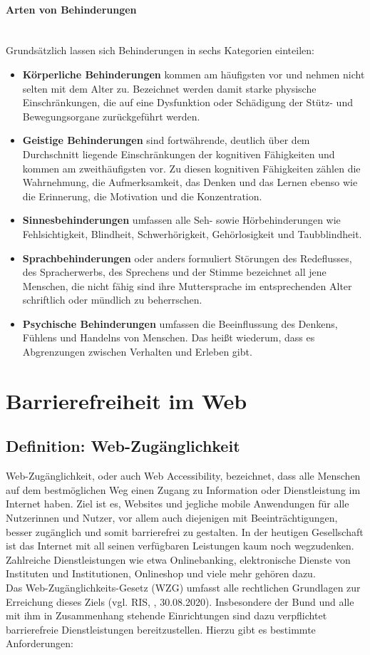 \paragraph{Arten von Behinderungen}\mbox{}\\
Grundsätzlich lassen sich Behinderungen in sechs Kategorien einteilen:

\begin{itemize}
    \item \textbf{Körperliche Behinderungen} kommen am häufigsten vor und nehmen nicht selten mit dem Alter zu. Bezeichnet werden damit starke physische Einschränkungen, die auf eine Dysfunktion oder Schädigung der Stütz- und Bewegungsorgane zurückgeführt werden.
    \item \textbf{Geistige Behinderungen} sind fortwährende, deutlich über dem Durchschnitt liegende Einschränkungen der kognitiven Fähigkeiten und kommen am zweithäufigsten vor. Zu diesen kognitiven Fähigkeiten zählen die Wahrnehmung, die Aufmerksamkeit, das Denken und das Lernen ebenso wie die Erinnerung, die Motivation und die Konzentration.
    \item \textbf{Sinnesbehinderungen} umfassen alle Seh- sowie Hörbehinderungen wie Fehlsichtigkeit, Blindheit, Schwerhörigkeit, Gehörlosigkeit und Taubblindheit.
    \item \textbf{Sprachbehinderungen} oder anders formuliert Störungen des Redeflusses, des Spracherwerbs, des Sprechens und der Stimme bezeichnet all jene Menschen, die nicht fähig sind ihre Muttersprache im entsprechenden Alter schriftlich oder mündlich zu beherrschen.
    \item \textbf{Psychische Behinderungen} umfassen die Beeinflussung des Denkens, Fühlens und Handelns von Menschen. Das heißt wiederum, dass es Abgrenzungen zwischen Verhalten und Erleben gibt.
\end{itemize}

\section{Barrierefreiheit im Web}
\subsection{Definition: Web-Zugänglichkeit}
Web-Zugänglichkeit, oder auch Web Accessibility, bezeichnet, dass alle Menschen auf dem bestmöglichen Weg einen Zugang zu Information oder Dienstleistung im Internet haben. Ziel ist es, Websites und jegliche mobile Anwendungen für alle Nutzerinnen und Nutzer, vor allem auch diejenigen mit Beeinträchtigungen, besser zugänglich und somit barrierefrei zu gestalten. In der heutigen Gesellschaft ist das Internet mit all seinen verfügbaren Leistungen kaum noch wegzudenken. Zahlreiche Dienstleistungen wie etwa Onlinebanking, elektronische Dienste von Instituten und Institutionen, Onlineshop und viele mehr gehören dazu.\\
Das Web-Zugänglichkeits-Gesetz (WZG) umfasst alle rechtlichen Grundlagen zur Erreichung dieses Ziels (vgl. RIS, \cite{ris_wzg_2020}, 30.08.2020). Insbesondere der Bund und alle mit ihm in Zusammenhang stehende Einrichtungen sind dazu verpflichtet barrierefreie Dienstleistungen bereitzustellen. Hierzu gibt es bestimmte Anforderungen:

